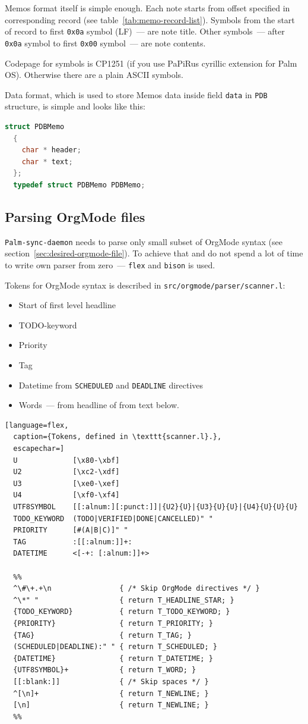 \documentclass[a4paper,12pt,oneside]{scrartcl}
\begin{document}
Memos format itself is simple enough. Each note starts from offset specified in
corresponding record (see table~\ref{tab:memo-record-list}). Symbols from the
start of record to first \texttt{0x0a} symbol (LF)~--- are note title. Other
symbols~--- after \texttt{0x0a} symbol to first \texttt{0x00} symbol~--- are
note contents.

Codepage for symbols is CP1251 (if you use PaPiRus cyrillic extension for Palm
OS). Otherwise there are a plain ASCII symbols.

Data format, which is used to store Memos data inside field \texttt{data} in
\texttt{PDB} structure, is simple and looks like this:
\begin{lstlisting}[language=C, caption={C structure to store memo data}]
  struct PDBMemo
  {
	char * header;
	char * text;
  };
  typedef struct PDBMemo PDBMemo;
\end{lstlisting}

\subsection{Parsing OrgMode files}
\label{sec:pars-orgm-files}

\texttt{Palm-sync-daemon} needs to parse only small subset of OrgMode syntax
(see section~\ref{sec:desired-orgmode-file}). To achieve that and do not spend a
lot of time to write own parser from zero~--- \texttt{flex} and \texttt{bison}
is used.

Tokens for OrgMode syntax is described in \texttt{src/orgmode/parser/scanner.l}:
\begin{itemize}
\item Start of first level headline
\item TODO-keyword
\item Priority
\item Tag
\item Datetime from \texttt{SCHEDULED} and \texttt{DEADLINE} directives
\item Words~--- from headline of from text below.
\end{itemize}

\begin{lstlisting}[language=flex,
  caption={Tokens, defined in \texttt{scanner.l}.},
  escapechar=]
  U             [\x80-\xbf]
  U2            [\xc2-\xdf]
  U3            [\xe0-\xef]
  U4            [\xf0-\xf4]
  UTF8SYMBOL    [[:alnum:][:punct:]]|{U2}{U}|{U3}{U}{U}|{U4}{U}{U}{U}
  TODO_KEYWORD  (TODO|VERIFIED|DONE|CANCELLED)" "
  PRIORITY      [#(A|B|C)]" "
  TAG           :[[:alnum:]]+:
  DATETIME      <[-+: [:alnum:]]+>

  %%
  ^\#\+.+\n                { /* Skip OrgMode directives */ }
  ^\*" "                   { return T_HEADLINE_STAR; }
  {TODO_KEYWORD}           { return T_TODO_KEYWORD; }
  {PRIORITY}               { return T_PRIORITY; }
  {TAG}                    { return T_TAG; }
  (SCHEDULED|DEADLINE):" " { return T_SCHEDULED; }
  {DATETIME}               { return T_DATETIME; }
  {UTF8SYMBOL}+            { return T_WORD; }
  [[:blank:]]              { /* Skip spaces */ }
  ^[\n]+                   { return T_NEWLINE; }
  [\n]                     { return T_NEWLINE; }
  %%
\end{lstlisting}
\end{document}
